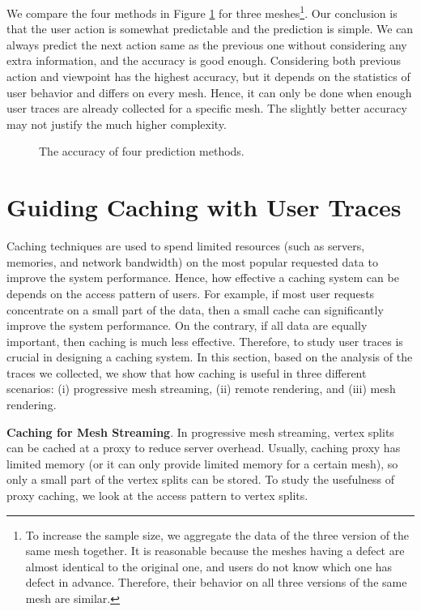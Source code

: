 We compare the four methods in Figure \ref{f:user:accuracy_comp} for three meshes\footnote{
To increase the sample size, we aggregate the data of the three version of the same mesh together.
It is reasonable because the meshes having a defect are almost identical to the original one, 
and users do not know which one has defect in advance. Therefore, their behavior on 
all three versions of the same mesh are similar.}.
Our conclusion is that the user action is somewhat predictable and the prediction is simple.
We can always predict the next action same as the previous one without considering
any extra information, and the accuracy is good enough. 
Considering both previous action and viewpoint has the highest accuracy,
but it depends on the statistics of user behavior and differs on every mesh. Hence, it can only 
be done when enough user traces are already collected for a specific mesh. 
The slightly better accuracy may not justify the much higher complexity.
\begin{figure}
    \centering
    \caption{The accuracy of four prediction methods.}
    \label{f:user:accuracy_comp}
\end{figure}

\section{Guiding Caching with User Traces}
Caching techniques are used to spend limited resources (such as 
servers, memories, and network bandwidth) on the most popular requested 
data to improve the system performance. 
Hence, how effective a caching system can be depends on the access pattern
of users. For example, if most user requests concentrate on a small 
part of the data, then a small cache can significantly improve the 
system performance. On the contrary, if all data are equally important,
then caching is much less effective. Therefore, to study user traces
is crucial in designing a caching system.
In this section, based on the analysis of the traces we collected, 
we show that how caching is useful in three different scenarios:
(i) progressive mesh streaming, (ii) remote rendering, and (iii) 
mesh rendering.

\textbf{Caching for Mesh Streaming}.
In progressive mesh streaming, vertex splits can be cached at a proxy to reduce server overhead.
Usually, caching proxy has limited memory (or it can only provide limited memory for a certain mesh),
so only a small part of the vertex splits can be stored. To study the usefulness of proxy caching,
we look at the access pattern to vertex splits.

